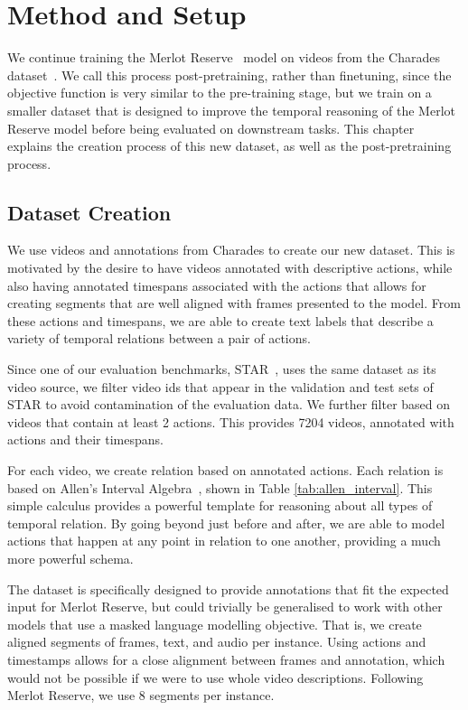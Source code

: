 \chapter{Method and Setup}
\label{chap:setup}

We continue training the Merlot Reserve~\citep{zellers2022mreserve} model on
videos from the Charades dataset~\citep{sigurdsson2016charades}. We call this
process post-pretraining, rather than finetuning, since the objective function
is very similar to the pre-training stage, but we train on a smaller dataset
that is designed to improve the temporal reasoning of the Merlot Reserve model
before being evaluated on downstream tasks. This chapter explains the creation
process of this new dataset, as well as the post-pretraining process.

\section{Dataset Creation}
\label{sec:data}

We use videos and annotations from Charades to create our new dataset. This is
motivated by the desire to have videos annotated with descriptive actions,
while also having annotated timespans associated with the actions that allows
for creating segments that are well aligned with frames presented to the model.
From these actions and timespans, we are able to create text labels that
describe a variety of temporal relations between a pair of actions.

Since one of our evaluation benchmarks, STAR~\citep{wu2021star}, uses the same
dataset as its video source, we filter video ids that appear in the validation
and test sets of STAR to avoid contamination of the evaluation data. We further
filter based on videos that contain at least 2 actions. This provides 7204
videos, annotated with actions and their timespans.

For each video, we create relation based on annotated actions. Each relation is
based on Allen's Interval Algebra~\citep{allen1983interval}, shown in Table
\ref{tab:allen_interval}. This simple calculus provides a powerful template for
reasoning about all types of temporal relation. By going beyond just before and
after, we are able to model actions that happen at any point in relation to one
another, providing a much more powerful schema.

The dataset is specifically designed to provide annotations that fit the
expected input for Merlot Reserve, but could trivially be generalised to work
with other models that use a masked language modelling objective.  That is, we
create aligned segments of frames, text, and audio per instance.  Using actions
and timestamps allows for a close alignment between frames and annotation,
which would not be possible if we were to use whole video descriptions.
Following Merlot Reserve, we use 8 segments per instance.

